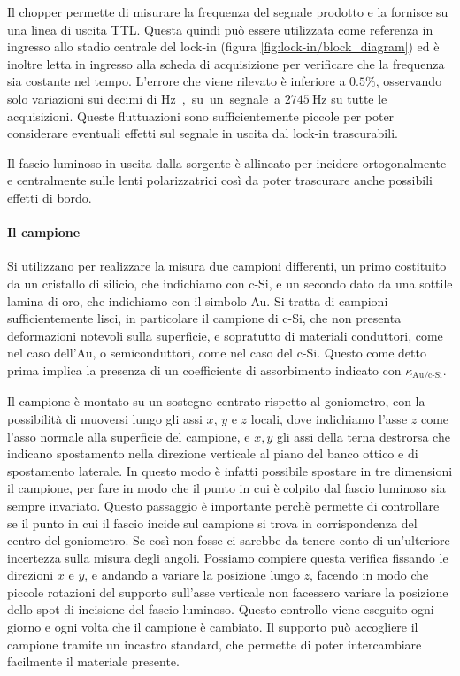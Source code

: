 \documentclass[
    prb,altaffilletter,citeautoscript,
    amsmath,amssymb,
    showpacs,showkeys,floatfix,
    reprint
]{revtex4-1}
\begin{document}
Il chopper permette di misurare la frequenza del segnale prodotto e la fornisce su una linea di uscita TTL. Questa quindi può essere utilizzata come referenza in ingresso allo stadio centrale del lock-in (figura \ref{fig:lock-in/block_diagram}) ed è inoltre letta in ingresso alla scheda di acquisizione per verificare che la frequenza sia costante nel tempo. L'errore che viene rilevato è inferiore a $0.5\%$, osservando solo variazioni sui decimi di \si\hertz, su un segnale a $\SI{2745}\hertz$ su tutte le acquisizioni. Queste fluttuazioni sono sufficientemente piccole per poter considerare eventuali effetti sul segnale in uscita dal lock-in trascurabili. 

Il fascio luminoso in uscita dalla sorgente è allineato per incidere ortogonalmente e centralmente sulle lenti polarizzatrici così da poter trascurare anche possibili effetti di bordo. 

\paragraph*{Il campione} Si utilizzano per realizzare la misura due campioni differenti, un primo costituito da un cristallo di silicio, che indichiamo con c-Si, e un secondo dato da una sottile lamina di oro, che indichiamo con il simbolo Au. Si tratta di campioni sufficientemente lisci, in particolare il campione di c-Si, che non presenta deformazioni notevoli sulla superficie, e sopratutto di materiali conduttori, come nel caso dell'Au, o semiconduttori, come nel caso del c-Si. Questo come detto prima implica la presenza di un coefficiente di assorbimento indicato con $\kappa_\text{Au/c-Si}$. 

Il campione è montato su un sostegno centrato rispetto al goniometro, con la possibilità di muoversi lungo gli assi $x$, $y$ e $z$ locali, dove indichiamo l'asse $z$ come l'asso normale alla superficie del campione, e $x, y$ gli assi della terna destrorsa che indicano spostamento nella direzione verticale al piano del banco ottico e di spostamento laterale. In questo modo è infatti possibile spostare in tre dimensioni il campione, per fare in modo che il punto in cui è colpito dal fascio luminoso sia sempre invariato. Questo passaggio è importante perchè permette di controllare se il punto in cui il fascio incide sul campione si trova in corrispondenza del centro del goniometro. Se così non fosse ci sarebbe da tenere conto di un'ulteriore incertezza sulla misura degli angoli. Possiamo compiere questa verifica fissando le direzioni $x$ e $y$, e andando a variare la posizione lungo $z$, facendo in modo che piccole rotazioni del supporto sull'asse verticale non facessero variare la posizione dello spot di incisione del fascio luminoso. Questo controllo viene eseguito ogni giorno e ogni volta che il campione è cambiato. Il supporto può accogliere il campione tramite un incastro standard, che permette di poter intercambiare facilmente il materiale presente. 
\end{document}
